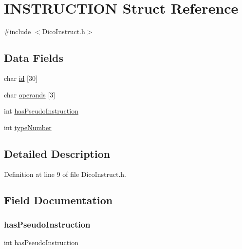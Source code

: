 \hypertarget{struct_i_n_s_t_r_u_c_t_i_o_n}{}\section{I\+N\+S\+T\+R\+U\+C\+T\+I\+ON Struct Reference}
\label{struct_i_n_s_t_r_u_c_t_i_o_n}


{\ttfamily \#include $<$Dico\+Instruct.\+h$>$}

\subsection*{Data Fields}
\begin{DoxyCompactItemize}
\item 
char \mbox{\hyperlink{struct_i_n_s_t_r_u_c_t_i_o_n_a29715edd3daae6d5b9cb15704f224b75}{id}} \mbox{[}30\mbox{]}
\item 
char \mbox{\hyperlink{struct_i_n_s_t_r_u_c_t_i_o_n_a8b7efa1cba40cfc8101d16c03857fc6b}{operands}} \mbox{[}3\mbox{]}
\item 
int \mbox{\hyperlink{struct_i_n_s_t_r_u_c_t_i_o_n_a53d0d5ab8c04a6092cf91d9f5d1615fb}{has\+Pseudo\+Instruction}}
\item 
int \mbox{\hyperlink{struct_i_n_s_t_r_u_c_t_i_o_n_a1852ececfb6b7e1f134dbb876feb2c52}{type\+Number}}
\end{DoxyCompactItemize}


\subsection{Detailed Description}


Definition at line 9 of file Dico\+Instruct.\+h.



\subsection{Field Documentation}
\mbox{\label{struct_i_n_s_t_r_u_c_t_i_o_n_a53d0d5ab8c04a6092cf91d9f5d1615fb}} 
\subsubsection{\texorpdfstring{has\+Pseudo\+Instruction}{hasPseudoInstruction}}
{\footnotesize\ttfamily int has\+Pseudo\+Instruction}



